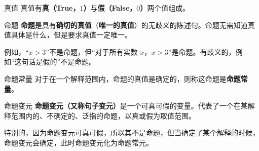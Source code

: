 
\begin{definition}{真值}
真值有\textbf{真（True，$1$）}与\textbf{假（False，$0$）}两个值组成。
\end{definition}

\begin{definition}{命题}
\textbf{命题}是具有\textbf{确切的真值}（\textbf{唯一的真值}）的无歧义的陈述句。命题无需知道真值具体是什么，但是要求真值一定唯一。
\end{definition}
例如，“$x>3$”不是命题，但“对于所有实数 $x$，$x>3$”是命题。有歧义的，例如“这句话是假的”不是命题。



\begin{definition}{命题常量}
对于在一个解释范围内，命题的真值是确定的，则称这命题是\textbf{命题常量}。
\end{definition}
\begin{definition}{命题变元}
\textbf{命题变元（又称句子变元）}是一个可真可假的变量。代表了一个在某解释范围内的、不确定的、泛指的命题，以真或假为取值范围。
\end{definition}
特别的，因为命题变元可真可假，所以其不是命题，但当确定了某个解释的时候，命题变元会确定，此时命题变元化为命题常元。